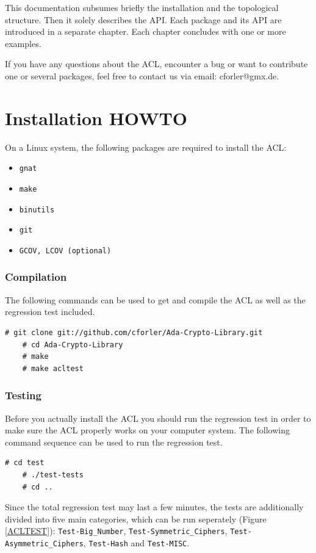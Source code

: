 This documentation subsumes briefly the installation and the
topological structure.  Then it solely describes the API. Each package
and its API are introduced in a separate chapter. Each chapter
concludes with one or more examples.

If you have any questions about the ACL, encounter a bug or want to
contribute one or several packages, feel free to contact us via email:
cforler@gmx.de.


\section{Installation HOWTO}
On a Linux system, the following packages are required to install the ACL:
\begin{itemize}
\item \texttt{gnat}
\item \texttt{make}
\item \texttt{binutils}
\item \texttt{git}
\item \texttt{GCOV, LCOV (optional)}
\end{itemize}

\subsubsection{Compilation}
The following commands can be used to get and compile the ACL as
well as the regression test included. \bigskip
\begin{lstlisting}[style=BashInputStyle]
    # git clone git://github.com/cforler/Ada-Crypto-Library.git
    # cd Ada-Crypto-Library
    # make
    # make acltest
\end{lstlisting}

\subsubsection{Testing}
Before you actually install the ACL you should run the regression test
in order to make sure the ACL properly works on your computer
system. The following command sequence can be used to run the
regression test.\bigskip
\begin{lstlisting}[style=BashInputStyle]
    # cd test
    # ./test-tests
    # cd ..
\end{lstlisting}
Since the total regression test may last a few minutes, the tests are
additionally divided into five main categories, which can be run
seperately (Figure \ref{ACLTEST}): \texttt{Test-Big\_Number},
\texttt{Test-Symmetric\_Ciphers}, \texttt{Test-Asymmetric\_Ciphers},
\texttt{Test-Hash} and \texttt{Test-MISC}.

